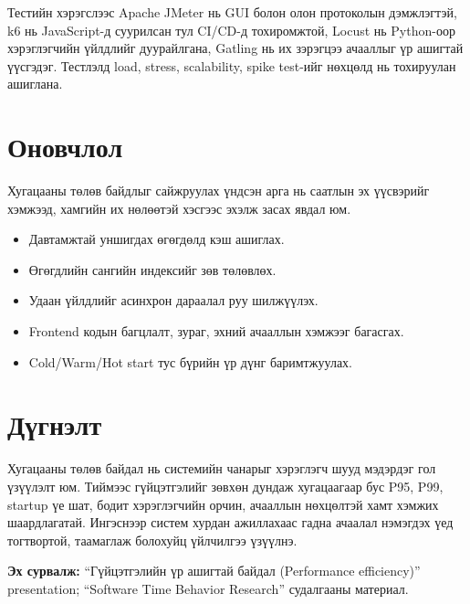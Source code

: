 \documentclass[10pt,a4paper,twocolumn]{article}
\begin{document}
Тестийн хэрэгслээс Apache JMeter нь GUI болон олон протоколын дэмжлэгтэй, k6 нь JavaScript-д суурилсан тул CI/CD-д тохиромжтой, Locust нь Python-оор хэрэглэгчийн үйлдлийг дуурайлгана, Gatling нь их зэрэгцээ ачааллыг үр ашигтай үүсгэдэг. Тестлэлд load, stress, scalability, spike test-ийг нөхцөлд нь тохируулан ашиглана.

\section{Оновчлол}
Хугацааны төлөв байдлыг сайжруулах үндсэн арга нь саатлын эх үүсвэрийг хэмжээд, хамгийн их нөлөөтэй хэсгээс эхэлж засах явдал юм.

\begin{itemize}
  \item Давтамжтай уншигдах өгөгдөлд кэш ашиглах.
  \item Өгөгдлийн сангийн индексийг зөв төлөвлөх.
  \item Удаан үйлдлийг асинхрон дараалал руу шилжүүлэх.
  \item Frontend кодын багцлалт, зураг, эхний ачааллын хэмжээг багасгах.
  \item Cold/Warm/Hot start тус бүрийн үр дүнг баримтжуулах.
\end{itemize}

\section{Дүгнэлт}
Хугацааны төлөв байдал нь системийн чанарыг хэрэглэгч шууд мэдэрдэг гол үзүүлэлт юм. Тиймээс гүйцэтгэлийг зөвхөн дундаж хугацаагаар бус P95, P99, startup үе шат, бодит хэрэглэгчийн орчин, ачааллын нөхцөлтэй хамт хэмжих шаардлагатай. Ингэснээр систем хурдан ажиллахаас гадна ачаалал нэмэгдэх үед тогтвортой, таамаглаж болохуйц үйлчилгээ үзүүлнэ.

{\footnotesize\textbf{Эх сурвалж:} ``Гүйцэтгэлийн үр ашигтай байдал (Performance efficiency)'' presentation; ``Software Time Behavior Research'' судалгааны материал.}
\end{document}
